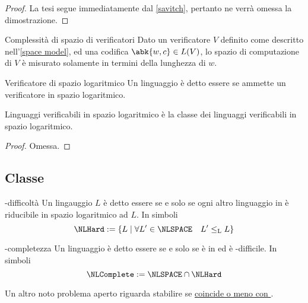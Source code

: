 \documentclass[a4paper, 12pt]{report}
\begin{document}
    \begin{proof}
        La tesi segue immediatamente dal \cref{savitch}, pertanto ne verrà omessa la dimostrazione.
    \end{proof}

    \begin{frameddefn}{Complessità di spazio di verificatori}
        Dato un verificatore $V$ definito come descritto nell'\cref{space model}, ed una codifica $\abk{w, c} \in L(V)$, lo spazio di computazione di $V$ è misurato solamente in termini della lunghezza di $w$.
    \end{frameddefn}

    \begin{frameddefn}{Verificatore di spazio logaritmico}
        Un linguaggio è detto essere  se ammette un verificatore in spazio logaritmico.
    \end{frameddefn}

    \begin{framedthm}[label={nl verif}]{Linguaggi verificabili in spazio logaritmico}
        \NLSPACE è la classe dei linguaggi verificabili in spazio logaritmico.
    \end{framedthm}

    \begin{proof}
        Omessa.
    \end{proof}

    \subsection{Classe \NLComplete}

    \begin{frameddefn}{\NLSPACE-difficoltà}
        Un lingauggio $L$ è detto essere  se e solo se ogni altro linguaggio in \NLSPACE è riducibile in spazio logaritmico ad $L$. In simboli $$\NLHard := \{L \mid \forall L' \in \NLSPACE \quad L' \leq_\mathrm L L\}$$
    \end{frameddefn}

    \begin{frameddefn}{\NLSPACE-completezza}
        Un linguaggio è detto essere  se e solo se è in \NLSPACE ed è \NLSPACE-difficile. In simboli $$\NLComplete := \NLSPACE \cap \NLHard$$
    \end{frameddefn}

    \begin{framedobs}{}
        Un altro noto problema aperto riguarda stabilire se \href{https://en.wikipedia.org/wiki/NL_(complexity)}{\LSPACE coincide o meno con \NLSPACE}.
    \end{framedobs}
\end{document}
